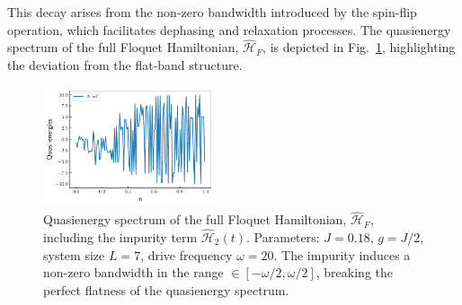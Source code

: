\documentclass[a4paper,10pt]{article}
\begin{document}
This decay arises from the non-zero bandwidth introduced by the spin-flip operation, which facilitates dephasing and relaxation processes. The quasienergy spectrum of the full Floquet Hamiltonian, $\hat{\mathcal{H}}_F$, is depicted in Fig.~\ref{figs:impure_flatband_qe}, highlighting the deviation from the flat-band structure.
\begin{figure}[h!]
    \centering
    \includegraphics[width=0.45\textwidth]{figs/impure_flatband_qe.pdf}
    \caption{Quasienergy spectrum of the full Floquet Hamiltonian, $\hat{\mathcal{H}}_F$, including the impurity term $\hat{\mathcal{H}}_2(t)$. Parameters: $J=0.18$, $g=J/2$, system size $L=7$, drive frequency $\omega=20$. The impurity induces a non-zero bandwidth in the range $\in[-\omega/2 , \omega/2]$, breaking the perfect flatness of the quasienergy spectrum.}
    \label{figs:impure_flatband_qe}
\end{figure}




\printbibliography{}
\end{document}
